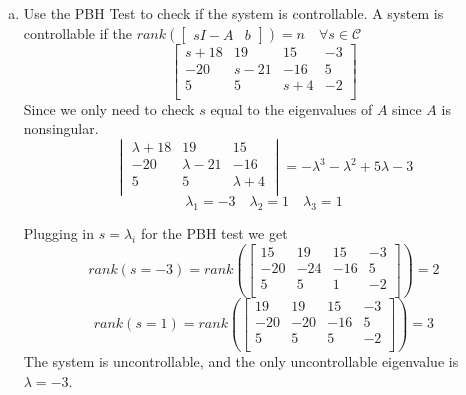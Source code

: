 \documentclass{article}
\begin{document}
\begin{enumerate}[(a)]
\item Use the PBH Test to check if the system is controllable.
\newline
\newline
A system is controllable if the $rank\left(\begin{bmatrix} sI - A & b \end{bmatrix}\right) = n \quad \forall s \in \mathcal{C}$
$$
\begin{bmatrix}
s + 18 & 19   &  15 & -3 \\
   -20 & s-21 & -16 &  5 \\
     5 & 5    & s+4 & -2 \\
\end{bmatrix}
$$
Since we only need to check $s$ equal to the eigenvalues of $A$ since $A$ is nonsingular.
$$
\begin{vmatrix}
\lambda + 18 & 19   &  15 \\
   -20 & \lambda-21 & -16 \\
     5 & 5    & \lambda+4 \\
\end{vmatrix}
=
-\lambda^3 - \lambda^2 +5 \lambda -3
$$
$$
\lambda_1 = -3
\quad
\lambda_2 =  1
\quad
\lambda_3 =  1
$$

Plugging in $s=\lambda_i$ for the PBH test we get
$$
rank(s=-3) =
rank\left(
\begin{bmatrix}
 15 &  19 &  15 & -3 \\
-20 & -24 & -16 &  5 \\
  5 &   5 &   1 & -2 \\
\end{bmatrix}
\right) = 2
$$
$$
rank(s=1) =
rank\left(
\begin{bmatrix}
 19 &  19 &  15 & -3 \\
-20 & -20 & -16 &  5 \\
  5 &   5 &   5 & -2 \\
\end{bmatrix}
\right) = 3
$$
The system is uncontrollable, and the only uncontrollable eigenvalue is $\lambda = -3$.



\end{enumerate}
\end{document}
